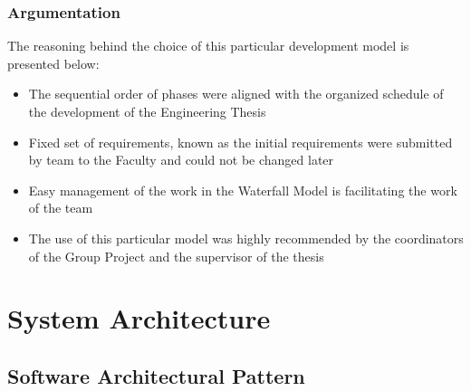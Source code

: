 \documentclass[a4paper,11pt,twoside]{report}
\theoremstyle{definition}
\begin{document}
\subsection{Argumentation}

The reasoning behind the choice of this particular development model is presented below:
\begin{itemize}
\item The sequential order of phases were aligned with the organized schedule of the development of the Engineering Thesis

\item Fixed set of requirements, known as the initial requirements were submitted by team to the Faculty and could not be changed later
\item Easy management of the work in the Waterfall Model is facilitating the work of the team
\item The use of this particular model was highly recommended by the coordinators of the Group Project and the supervisor of the thesis \cite{E}
 
\end{itemize}






\chapter{System Architecture}



\section{Software Architectural Pattern}
\end{document}
